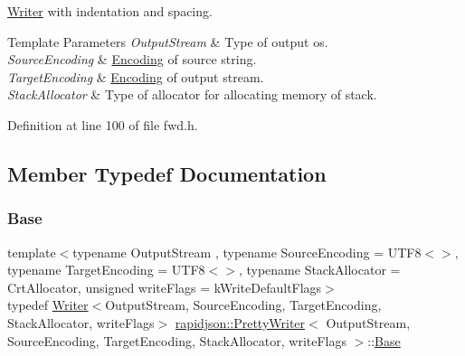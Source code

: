 \mbox{\hyperlink{classrapidjson_1_1_writer}{Writer}} with indentation and spacing. 


\begin{DoxyTemplParams}{Template Parameters}
{\em Output\+Stream} & Type of output os. \\
\hline
{\em Source\+Encoding} & \mbox{\hyperlink{classrapidjson_1_1_encoding}{Encoding}} of source string. \\
\hline
{\em Target\+Encoding} & \mbox{\hyperlink{classrapidjson_1_1_encoding}{Encoding}} of output stream. \\
\hline
{\em Stack\+Allocator} & Type of allocator for allocating memory of stack. \\
\hline
\end{DoxyTemplParams}


Definition at line 100 of file fwd.\+h.



\subsection{Member Typedef Documentation}
\mbox{\label{classrapidjson_1_1_pretty_writer_a792881200bdf51add62117617e66bd49}} 
\subsubsection{\texorpdfstring{Base}{Base}}
{\footnotesize\ttfamily template$<$typename Output\+Stream , typename Source\+Encoding  = U\+T\+F8$<$$>$, typename Target\+Encoding  = U\+T\+F8$<$$>$, typename Stack\+Allocator  = Crt\+Allocator, unsigned write\+Flags = k\+Write\+Default\+Flags$>$ \\
typedef \mbox{\hyperlink{classrapidjson_1_1_writer}{Writer}}$<$Output\+Stream, Source\+Encoding, Target\+Encoding, Stack\+Allocator, write\+Flags$>$ \mbox{\hyperlink{classrapidjson_1_1_pretty_writer}{rapidjson\+::\+Pretty\+Writer}}$<$ Output\+Stream, Source\+Encoding, Target\+Encoding, Stack\+Allocator, write\+Flags $>$\+::\mbox{\hyperlink{classrapidjson_1_1_pretty_writer_a792881200bdf51add62117617e66bd49}{Base}}}



